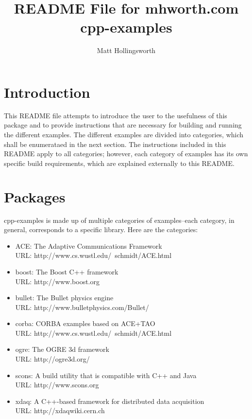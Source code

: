 \documentclass[a4paper,10pt]{article}
\title{README File for mhworth.com cpp-examples}
\author{Matt Hollingsworth}
\begin{document}
\setlength{\emergencystretch}{200em}
\maketitle

\section{Introduction}
This README file attempts to introduce the user to the usefulness of this package and to provide instructions that are necessary for building and running the different examples.  The different examples are divided into categories, which shall be enumerataed in the next section.  The instructions included in this README apply to all categories; however, each category of examples has its own specific build requirements, which are explained externally to this README.  

\section{Packages}
cpp-examples is made up of multiple categories of examples--each category, in general, corresponds to a specific library.  Here are the categories:

\begin{itemize}
 \item ACE: The Adaptive Communications Framework \\ URL: http://www.cs.wustl.edu/~schmidt/ACE.html
 \item boost: The Boost C++ framework \\ URL: http://www.boost.org
 \item bullet: The Bullet physics engine \\ URL: http://www.bulletphysics.com/Bullet/
 \item corba: CORBA examples based on ACE+TAO \\ URL: http://www.cs.wustl.edu/~schmidt/ACE.html
 \item ogre: The OGRE 3d framework \\ URL: http://ogre3d.org/
 \item scons: A build utility that is compatible with C++ and Java \\ URL: http://www.scons.org
 \item xdaq: A C++-based framework for distributed data acquisition \\ URL: http://xdaqwiki.cern.ch
\end{itemize}
\end{document}
